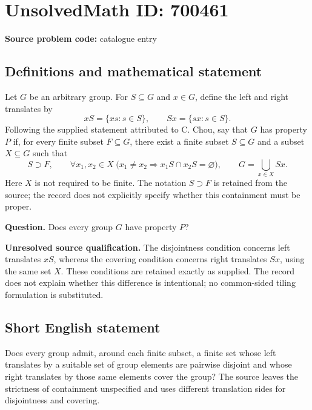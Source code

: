 \documentclass[11pt]{article}
\begin{document}
\section*{UnsolvedMath ID: 700461}
\textbf{Source problem code:} catalogue entry
\subsection{Definitions and mathematical statement}
Let \(G\) be an arbitrary group. For \(S\subseteq G\) and \(x\in G\), define the left and right translates by
\[
xS=\{xs:s\in S\},\qquad Sx=\{sx:s\in S\}.
\]
Following the supplied statement attributed to C. Chou, say that \(G\) has property \(P\) if, for every finite subset \(F\subseteq G\), there exist a finite subset \(S\subseteq G\) and a subset \(X\subseteq G\) such that
\[
S\supset F,\qquad
\forall x_1,x_2\in X\;\bigl(x_1\ne x_2\Longrightarrow x_1S\cap x_2S=\varnothing\bigr),\qquad
G=\bigcup_{x\in X}Sx.
\]
Here \(X\) is not required to be finite. The notation \(S\supset F\) is retained from the source; the record does not explicitly specify whether this containment must be proper.

\textbf{Question.} Does every group \(G\) have property \(P\)?

\textbf{Unresolved source qualification.} The disjointness condition concerns left translates \(xS\), whereas the covering condition concerns right translates \(Sx\), using the same set \(X\). These conditions are retained exactly as supplied. The record does not explain whether this difference is intentional; no common-sided tiling formulation is substituted.
\subsection{Short English statement}
Does every group admit, around each finite subset, a finite set whose left translates by a suitable set of group elements are pairwise disjoint and whose right translates by those same elements cover the group? The source leaves the strictness of containment unspecified and uses different translation sides for disjointness and covering.
\end{document}
